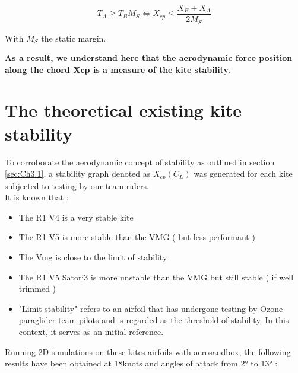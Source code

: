 \begin{equation}
    T_{A} \geq T_{B}M_{S} \iff X_{cp} \leq  \frac{X_{B}+X_{A}}{2M_{S}}
    \label{eq:last equation}
\end{equation}

With $M_{S}$ the static margin.

\textbf{As a result, we understand here that the aerodynamic force position along the chord Xcp is a measure of the kite stability}.\\



\section{The theoretical existing kite stability}
\label{sec:Ch3.2}

To corroborate the aerodynamic concept of stability as outlined in section \ref{sec:Ch3.1}, a stability graph denoted as $X_{cp}(C_{L})$ was generated for each kite subjected to testing by our team riders. \\

It is known that : 
\begin{itemize}
    \item The R1 V4 is a very stable kite
    \item The R1 V5 is more stable than the VMG ( but less performant ) 
    \item The Vmg is close to the limit of stability
    \item The R1 V5 Satori3 is more unstable than the VMG but still stable ( if well trimmed )
    \item "Limit stability" refers to an airfoil that has undergone testing by Ozone paraglider team pilots and is regarded as the threshold of stability. In this context, it serves as an initial reference.
\end{itemize}

Running 2D simulations on these kites airfoils with aerosandbox, the following results have been obtained at 18knots and angles of attack from 2° to 13° : 

